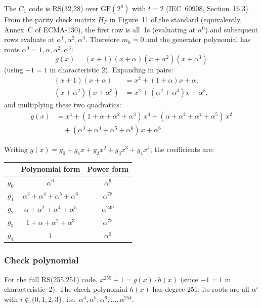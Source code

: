 \documentclass[11pt,a4paper]{article}
\begin{document}
The $C_1$ code is RS(32,28) over $\text{GF}(2^8)$ with $t = 2$ (IEC~60908, Section~16.3). From the parity check matrix $H_P$ in Figure~11 of the standard (equivalently, Annex~C of ECMA-130), the first row is all~1s (evaluating at $\alpha^0$) and subsequent rows evaluate at $\alpha^1, \alpha^2, \alpha^3$. Therefore $m_0 = 0$ and the generator polynomial has roots $\alpha^0 = 1, \alpha, \alpha^2, \alpha^3$:
\[
g(x) = (x + 1)(x + \alpha)(x + \alpha^2)(x + \alpha^3)
\]
(using $-1 = 1$ in characteristic 2). Expanding in pairs:
\begin{align*}
(x+1)(x+\alpha) &= x^2 + (1+\alpha)x + \alpha, \\
(x+\alpha^2)(x+\alpha^3) &= x^2 + (\alpha^2+\alpha^3)x + \alpha^5,
\end{align*}
and multiplying these two quadratics:
\begin{align*}
g(x) &= x^4 + (1+\alpha+\alpha^2+\alpha^3)\,x^3
+ (\alpha+\alpha^2+\alpha^4+\alpha^5)\,x^2 \\
&\quad + (\alpha^3+\alpha^4+\alpha^5+\alpha^6)\,x
+ \alpha^6.
\end{align*}

Writing $g(x) = g_0 + g_1 x + g_2 x^2 + g_3 x^3 + g_4 x^4$, the coefficients are:

\begin{table}[H]
\centering
\begin{tabular}{ccc}
\toprule
 & Polynomial form & Power form \\
\midrule
$g_0$ & $\alpha^6$ & $\alpha^{6}$ \\
$g_1$ & $\alpha^3+\alpha^4+\alpha^5+\alpha^6$ & $\alpha^{78}$ \\
$g_2$ & $\alpha+\alpha^2+\alpha^4+\alpha^5$ & $\alpha^{249}$ \\
$g_3$ & $1+\alpha+\alpha^2+\alpha^3$ & $\alpha^{75}$ \\
$g_4$ & $1$ & $\alpha^0$ \\
\bottomrule
\end{tabular}
\end{table}

\subsubsection{Check polynomial}

For the full RS(255,251) code, $x^{255} + 1 = g(x) \cdot h(x)$ (since $-1 = 1$ in characteristic~2).
The check polynomial $h(x)$ has degree 251; its roots are all $\alpha^i$ with $i \notin \{0,1,2,3\}$, i.e.\ $\alpha^4, \alpha^5, \alpha^6, \ldots, \alpha^{254}$.
\end{document}

